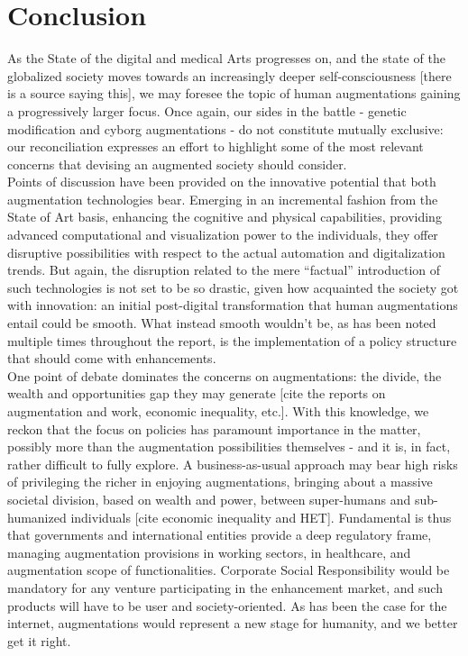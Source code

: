 
\chapter*{Conclusion}
\label{cha:conclusion}

As the State of the digital and medical Arts progresses on, and the state of the globalized society moves towards an increasingly deeper self-consciousness [there is a source saying this], we may foresee the topic of human augmentations gaining a progressively larger focus. Once again, our sides in the battle - genetic modification and cyborg augmentations - do not constitute mutually exclusive: our reconciliation expresses an effort to highlight some of the most relevant concerns that devising an augmented society should consider.\\

Points of discussion have been provided on the innovative potential that both augmentation technologies bear. Emerging in an incremental fashion from the State of Art basis, enhancing the cognitive and physical capabilities, providing advanced computational and visualization power to the individuals, they offer disruptive possibilities with respect to the actual automation and digitalization trends.  But again, the disruption related to the mere “factual” introduction of such technologies is not set to be so drastic, given how acquainted the society got with innovation: an initial post-digital transformation that human augmentations entail could be smooth. What instead smooth wouldn’t be, as has been noted multiple times throughout the report, is the implementation of a policy structure that should come with enhancements.\\

One point of debate dominates the concerns on augmentations: the divide, the wealth and opportunities gap they may generate [cite the reports on augmentation and work, economic inequality, etc.]. With this knowledge, we reckon that the focus on policies has paramount importance in the matter, possibly more than the augmentation possibilities themselves - and it is, in fact, rather difficult to fully explore. A business-as-usual approach may bear high risks of privileging the richer in enjoying augmentations, bringing about a massive societal division, based on wealth and power, between super-humans and sub-humanized individuals [cite economic inequality and HET]. Fundamental is thus that governments and international entities provide a deep regulatory frame, managing augmentation provisions in working sectors, in healthcare, and augmentation scope of functionalities. Corporate Social Responsibility would be mandatory for any venture participating in the enhancement market, and such products will have to be user and society-oriented. As has been the case for the internet, augmentations would represent a new stage for humanity, and we better get it right.
